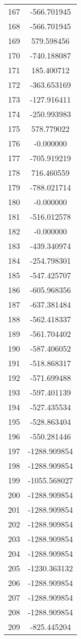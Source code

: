 \documentclass[12pt]{article}
\begin{document}
\begin{longtable}{@{}cc@{}}
167 & -566.701945 \\
168 & -566.701945 \\
169 & 579.598456 \\
170 & -740.188087 \\
171 & 185.400712 \\
172 & -363.653169 \\
173 & -127.916411 \\
174 & -250.993983 \\
175 & 578.779022 \\
176 & -0.000000 \\
177 & -705.919219 \\
178 & 716.460559 \\
179 & -788.021714 \\
180 & -0.000000 \\
181 & -516.012578 \\
182 & -0.000000 \\
183 & -439.340974 \\
184 & -254.798301 \\
185 & -547.425707 \\
186 & -605.968356 \\
187 & -637.381484 \\
188 & -562.418337 \\
189 & -561.704402 \\
190 & -587.406052 \\
191 & -518.868317 \\
192 & -571.699488 \\
193 & -597.401139 \\
194 & -527.435534 \\
195 & -528.863404 \\
196 & -550.281446 \\
197 & -1288.909854 \\
198 & -1288.909854 \\
199 & -1055.568027 \\
200 & -1288.909854 \\
201 & -1288.909854 \\
202 & -1288.909854 \\
203 & -1288.909854 \\
204 & -1288.909854 \\
205 & -1230.363132 \\
206 & -1288.909854 \\
207 & -1288.909854 \\
208 & -1288.909854 \\
209 & -825.445204 \\

\end{longtable}
\end{document}
